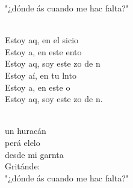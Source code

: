 \begin{cancion}[Huracán][Hakuna]
\begin{chorus}
	"¿dónde ás cuando me hac falta?"\\
	\end{chorus}%
	\jump\\
	Estoy aq, en el sicio \\
	Estoy a, en este ento \\
	Estoy aq, soy este zo de n \\
	Estoy aí, en tu lnto\\
	Estoy a, en este o \\
	Estoy aq, soy este zo de n. \\\jump\\
	\begin{chorus}%
	un huracán\\
	perá elelo \\
	desde mi garnta\\
	Gritánde:\\
	"¿dónde ás cuando me hac falta?"\\
	\end{chorus}%
	\jump\\
\end{cancion}%

